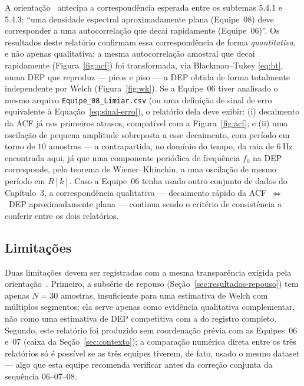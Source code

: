 A orientação~\cite{orientacaocap5} antecipa a correspondência esperada entre os subtemas 5.4.1 e
5.4.3: ``uma densidade espectral aproximadamente plana (Equipe~08) deve corresponder a uma
autocorrelação que decai rapidamente (Equipe~06)''. Os resultados deste relatório confirmam essa
correspondência de forma \emph{quantitativa}, e não apenas qualitativa: a mesma autocorrelação
amostral que decai rapidamente (Figura~\ref{fig:acf}) foi transformada, via Blackman--Tukey
\eqref{eq:bt}, numa DEP que reproduz --- picos e piso --- a DEP obtida de forma totalmente
independente por Welch (Figura~\ref{fig:wk}). Se a Equipe~06 tiver analisado o mesmo arquivo
\texttt{Equipe\_08\_Limiar.csv} (ou uma definição de sinal de erro equivalente à
Equação~\eqref{eq:sinal-erro}), o relatório dela deve exibir: (i) decaimento da ACF já nos
primeiros atrasos, compatível com a Figura~\ref{fig:acf}; e (ii) uma oscilação de pequena
amplitude sobreposta a esse decaimento, com período em torno de $10$ amostras --- a contrapartida,
no domínio do tempo, da raia de $6\ \text{Hz}$ encontrada aqui, já que uma componente periódica
de frequência $f_0$ na DEP corresponde, pelo teorema de Wiener--Khinchin, a uma oscilação de
mesmo período em $R[k]$. Caso a Equipe~06 tenha usado outro conjunto de dados do Capítulo~3, a
correspondência qualitativa --- decaimento rápido da ACF~$\Leftrightarrow$~DEP aproximadamente
plana --- continua sendo o critério de consistência a conferir entre os dois relatórios.

\subsection{Limitações}

Duas limitações devem ser registradas com a mesma transparência exigida pela
orientação~\cite{orientacaocap5}. Primeiro, a subsérie de repouso
(Seção~\ref{sec:resultados-repouso}) tem apenas $N=30$ amostras, insuficiente para uma estimativa
de Welch com múltiplos segmentos; ela serve apenas como evidência qualitativa complementar, não
como uma estimativa de DEP competitiva com a do registro completo. Segundo, este relatório foi
produzido sem coordenação prévia com as Equipes~06 e~07 (caixa da Seção~\ref{sec:contexto}); a
comparação numérica direta entre os três relatórios só é possível se as três equipes tiverem, de
fato, usado o mesmo dataset --- algo que esta equipe recomenda verificar antes da correção
conjunta da sequência 06--07--08.

